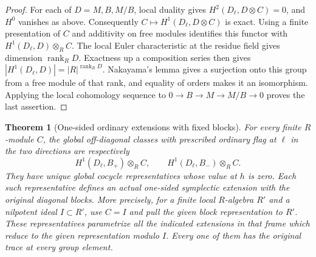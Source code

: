 \documentclass[a4paper,11pt]{article}
\newtheorem{theorem}[proposition]{Theorem}
\theoremstyle{definition}
\theoremstyle{remark}
\numberwithin{equation}{section}
\begin{document}
\begin{proof}
For each of \(D=M,B,M/B\), local duality gives
\(H^2(D_\ell,D\otimes C)=0\), and \(H^0\) vanishes as above.
Consequently \(C\mapsto H^1(D_\ell,D\otimes C)\) is exact.
Using a finite presentation of \(C\) and additivity on free
modules identifies this functor with
\(H^1(D_\ell,D)\otimes_R C\). The local Euler characteristic
at the residue field gives dimension \(\operatorname{rank}_R D\).
Exactness up a composition series then gives
\(|H^1(D_\ell,D)|=|R|^{\operatorname{rank}_R D}\).
Nakayama's lemma gives a surjection onto this group from a
free module of that rank, and equality of orders makes it an
isomorphism. Applying the local cohomology sequence to
\(0\to B\to M\to M/B\to0\) proves the last assertion.
\end{proof}

\begin{theorem}[One-sided ordinary extensions with fixed blocks]
\leavevmode\label{thm:ordinarycross568}
For every finite \(R\)-module \(C\), the global off-diagonal
classes with prescribed ordinary flag at \(\ell\) in the two
directions are respectively
\[
         H^1(D_\ell,B_+)\otimes_R C,\qquad
         H^1(D_\ell,B_-)\otimes_R C .
\]
They have unique global cocycle representatives whose value
at \(h\) is zero. Each such representative defines an actual
one-sided symplectic extension with the original diagonal
blocks. More precisely, for a finite local \(R\)-algebra
\(R'\) and a nilpotent ideal \(I\subset R'\), use \(C=I\)
and pull the given block representation to \(R'\).
These representatives parametrize all the indicated
extensions in that frame which reduce to the given
representation modulo \(I\). Every one of them has the
original trace at every group element.
\end{theorem}
\end{document}
